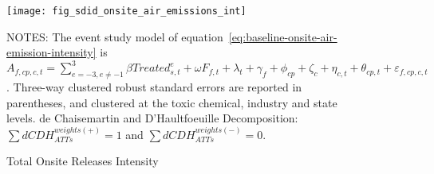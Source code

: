 \begin{figure}[H]
    \centering
    \texttt{[image: fig\_sdid\_onsite\_air\_emissions\_int]}
    \caption{Total Onsite Releases Intensity}
    \label{fig:baseline-onsite-air-emission-intensity}
    \begin{minipage}{\columnwidth}
        \vspace{0.05in}
        \tiny NOTES: The event study model of equation~\ref{eq:baseline-onsite-air-emission-intensity} is $A_{f,cp,c,t} = \sum_{{e = -3},{e \neq -1}}^{3} \beta Treated_{s,t}^e + \omega F_{f,t} + \lambda_{t} + \gamma_{f} + \phi_{cp} + \zeta_{c} + \eta_{c,t} + \theta_{cp,t} + \varepsilon_{f,cp,c,t}$. Three-way clustered robust standard errors are reported in parentheses, and clustered at the toxic chemical, industry and state levels. de Chaisemartin and D'Haultfoeuille Decomposition: $\sum dCDH_{ATTs}^{weights(+)} = 1$ and $\sum dCDH_{ATTs}^{weights(-)} = 0$.
    \end{minipage}
\end{figure}